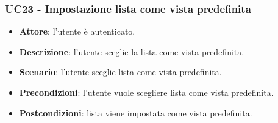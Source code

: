 \subsubsection{UC23 - Impostazione lista come vista predefinita}
\begin{itemize}
    \item \textbf{Attore}: l'utente è autenticato.
    \item \textbf{Descrizione}: l'utente sceglie la lista come vista predefinita.
    \item \textbf{Scenario}: l'utente sceglie lista come vista predefinita.
    \item \textbf{Precondizioni}: l'utente vuole scegliere lista come vista predefinita.
    \item \textbf{Postcondizioni}: lista viene impostata come vista predefinita.
\end{itemize}





